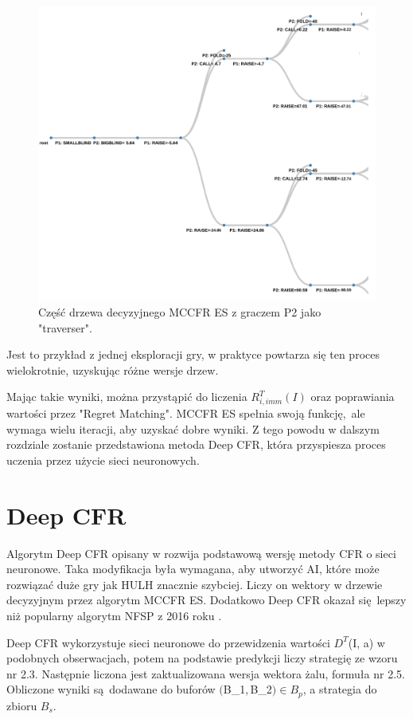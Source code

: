 \documentclass[12pt,oneside,a4paper]{report}
\begin{document}
\begin{figure}[!ht]
  \centering
  \includegraphics[width=1\textwidth]{./img/tree.pdf}
  \caption{Część drzewa decyzyjnego MCCFR ES z graczem P2 jako "traverser".}
\end{figure}


\vspace{5cm}
Jest to przykład z jednej eksploracji gry, w praktyce powtarza się ten proces wielokrotnie, 
uzyskując różne wersje drzew.


Mając takie wyniki, można przystąpić do liczenia $R_{i,imm}^{T} (I)$ oraz poprawiania 
wartości przez "Regret Matching". MCCFR ES spełnia swoją funkcję, ale wymaga wielu iteracji, aby
uzyskać dobre wyniki. Z tego powodu w dalszym rozdziale zostanie przedstawiona metoda Deep CFR,
która przyspiesza proces uczenia przez użycie sieci neuronowych.

\section{Deep CFR}


Algorytm Deep CFR  opisany w \cite{DCFR} rozwija podstawową wersję metody CFR o sieci neuronowe.
Taka modyfikacja była wymagana, aby utworzyć AI, które może rozwiązać duże gry
jak HULH znacznie szybciej. Liczy on wektory w drzewie decyzyjnym
przez algorytm MCCFR ES. Dodatkowo Deep CFR okazał się lepszy niż 
popularny algorytm NFSP z 2016 roku \cite{DCFR}.

Deep CFR wykorzystuje sieci neuronowe do przewidzenia wartości $D^{T}$(I, a) w podobnych
obserwacjach, potem na
podstawie predykcji liczy strategię ze wzoru nr 2.3.   
Następnie liczona jest zaktualizowana wersja wektora żalu, formuła nr 2.5.
Obliczone wyniki są dodawane do buforów  $($B_{1}$, $B_{2}$) \in B_{p}$, a strategia do zbioru $B_{s}$.
\end{document}
